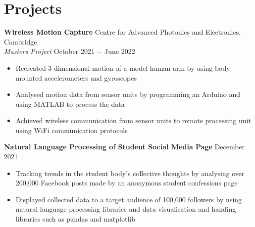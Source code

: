 \documentclass{article}
\begin{document}

\vspace{-0.75\baselineskip}
\hrulefill
\vspace{-0.75\baselineskip}

\section*{Projects}

\textbf{Wireless Motion Capture} \hfill Centre for Advanced Photonics and Electronics, Cambridge\\
\textit{Masters Project} \hfill October 2021 $-$ June 2022
\begin{itemize}
    \item Recreated 3 dimensional motion of a model human arm by using body mounted accelerometers and gyroscopes
    \item Analysed motion data from sensor units by programming an Arduino and using MATLAB to process the data
    \item Achieved wireless communication from sensor units to remote processing unit using WiFi communication protocols
\end{itemize} \smallskip

\textbf{Natural Language Processing of Student Social Media Page} \hfill December 2021
\begin{itemize}
    \item Tracking trends in the student body's collective thoughts by analysing over 200,000 Facebook posts made by an anonymous student confessions page
    \item Displayed collected data to a target audience of 100,000 followers by using natural language processing libraries and data visualisation and handing libraries such as pandas and matplotlib
\end{itemize} \smallskip
\end{document}

